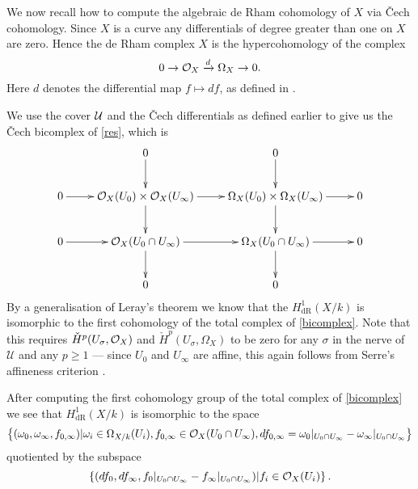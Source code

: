 \documentclass[draft, 11pt]{article} %
\theoremstyle{plain}
\theoremstyle{remark}
\newcommand{\cO}{{\cal O}}
\newcommand{\cU}{{\mathcal U}}
\newcommand{\cech}{\v{C}ech }
\newcommand{\derhamhone}{H_{\text {dR}}^1(X/k)}
\begin{document}
We now recall how to compute the algebraic de Rham cohomology of $X$ via \cech cohomology.
Since $X$ is a curve any differentials of degree greater than one on $X$ are zero.
Hence the de Rham complex $X$ is the hypercohomology of the complex
\begin{equation}\label{res}
0 \rightarrow \cO_X \xrightarrow{d} \Omega_X \rightarrow 0.
\end{equation}
Here $d$ denotes the differential map $f \mapsto df$, as defined in \cite[Chap II, \S 8, Pg. 172]{hart}.

We use the cover $\cal U$ and the \cech differentials as defined earlier to give us the \cech bicomplex of \eqref{res}, which is
\begin{equation}\label{bicomplex}
\xymatrix{ & 0 \ar[d] & 0 \ar[d] & \\
0 \ar[r] & \cO_X(U_0) \times \cO_X(U_\infty) \ar[d] \ar[r] & \Omega_X(U_0) \times \Omega_X(U_\infty) \ar[d] \ar[r] & 0 \\
0 \ar[r] & \cO_X(U_0\cap U_\infty) \ar[d] \ar[r] & \Omega_X(U_0 \cap U_\infty) \ar[r] \ar[d] & 0 \\
& 0 & 0 &}
\end{equation}
By a generalisation of Leray's theorem \cite[Cor 12.4.7]{EGA0III} we know that the $\derhamhone$ is isomorphic to the first cohomology of the total complex of \eqref{bicomplex}.
Note that this requires ${\check H}^p(U_\sigma, \cO_X)$ and ${\check H}^p(U_\sigma, \Omega_X)$ to be zero for any $\sigma$ in the nerve of $\cU$ and any $p \geq 1$ ---
since $U_0$ and $U_\infty$ are affine, this again follows from Serre's affineness criterion \cite[Thm 5.2.23]{liu}.



After computing the first cohomology group of the total complex of \eqref{bicomplex} we see that $\derhamhone$ is isomorphic to the space
\begin{equation}\label{derhamconditions}
\left\{(\omega_0, \omega_\infty, f_{0,\infty}) | \omega_i\in \Omega_{X/k}(U_i), f_{0,\infty}\in \cO_X(U_0 \cap U_\infty), df_{0,\infty} = \omega_0|_{U_0\cap U_\infty} - \omega_\infty|_{U_0\cap U_\infty} \right\}
\end{equation}
quotiented by the subspace
\begin{equation}\label{quotient}
\left\{  (df_0, df_\infty, f_0|_{U_0\cap U_\infty} -f_\infty|_{U_0\cap U_\infty} )|f_i \in \cO_X(U_i)\right\}.
\end{equation}
\end{document}
